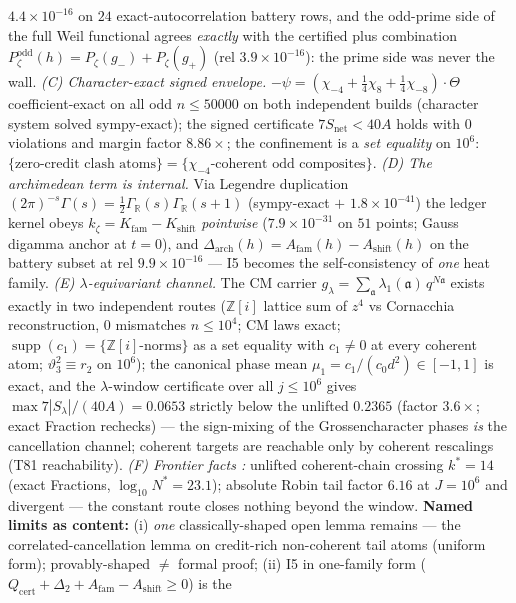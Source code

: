 \documentclass[11pt,a4paper]{article}
\newcommand{\Z}{\mathbb{Z}}
\theoremstyle{definition}
\begin{document}
$4.4\times10^{-16}$ on $24$ exact-autocorrelation battery rows, and the
odd-prime side of the full Weil functional agrees \emph{exactly} with the
certified plus combination
$P_\zeta^{\mathrm{odd}}(h)=P_\zeta(g_-)+P_\zeta(g_+)$
(rel $3.9\times10^{-16}$): the prime side was never the wall.
\emph{(C) Character-exact signed envelope.}
$-\psi=(\chi_{-4}+\tfrac14\chi_8+\tfrac14\chi_{-8})\cdot\Theta$
coefficient-exact on all odd $n\le50000$ on both independent builds
(character system solved sympy-exact); the signed certificate
$7S_{\mathrm{net}}<40A$ holds with $0$ violations and margin factor
$8.86\times$; the confinement is a \emph{set equality} on $10^6$:
$\{\text{zero-credit clash atoms}\}=\{\chi_{-4}\text{-coherent odd composites}\}$.
\emph{(D) The archimedean term is internal.} Via Legendre duplication
$(2\pi)^{-s}\Gamma(s)=\tfrac12\Gamma_{\mathbb R}(s)\Gamma_{\mathbb R}(s{+}1)$
(sympy-exact $+$ $1.8\times10^{-41}$) the ledger kernel obeys
$k_\zeta=K_{\mathrm{fam}}-K_{\mathrm{shift}}$ \emph{pointwise}
($7.9\times10^{-31}$ on $51$ points; Gauss digamma anchor at $t=0$), and
$\Delta_{\mathrm{arch}}(h)=A_{\mathrm{fam}}(h)-A_{\mathrm{shift}}(h)$ on the
battery subset at rel $9.9\times10^{-16}$ --- I5 becomes the self-consistency
of \emph{one} heat family.
\emph{(E) $\lambda$-equivariant channel.} The CM carrier
$g_\lambda=\sum_{\mathfrak a}\lambda_1(\mathfrak a)\,q^{N\mathfrak a}$ exists
exactly in two independent routes ($\Z[i]$ lattice sum of $z^4$ vs Cornacchia
reconstruction, $0$ mismatches $n\le10^4$; CM laws exact;
$\operatorname{supp}(c_1)=\{\Z[i]\text{-norms}\}$ as a set equality with
$c_1\ne0$ at every coherent atom; $\vartheta_3^2\equiv r_2$ on $10^6$); the
canonical phase mean $\mu_1=c_1/(c_0d^2)\in[-1,1]$ is exact, and the
$\lambda$-window certificate over all $j\le10^6$ gives
$\max 7|S_\lambda|/(40A)=0.0653$ strictly below the unlifted $0.2365$
(factor $3.6\times$; exact Fraction rechecks) --- the sign-mixing of the
Grossencharacter phases \emph{is} the cancellation channel; coherent targets
are reachable only by coherent rescalings (T81 reachability).
\emph{(F) Frontier facts \mC:} unlifted coherent-chain crossing $k^*=14$
(exact Fractions, $\log_{10}N^*=23.1$); absolute Robin tail factor $6.16$ at
$J=10^6$ and divergent --- the constant route closes nothing beyond the window.
\textbf{Named limits as content:} (i) \emph{one} classically-shaped open lemma
remains --- the correlated-cancellation lemma on credit-rich non-coherent tail
atoms (uniform form); provably-shaped $\neq$ formal proof; (ii) I5 in
one-family form
($Q_{\mathrm{cert}}+\Delta_2+A_{\mathrm{fam}}-A_{\mathrm{shift}}\ge0$) is the
\end{document}
